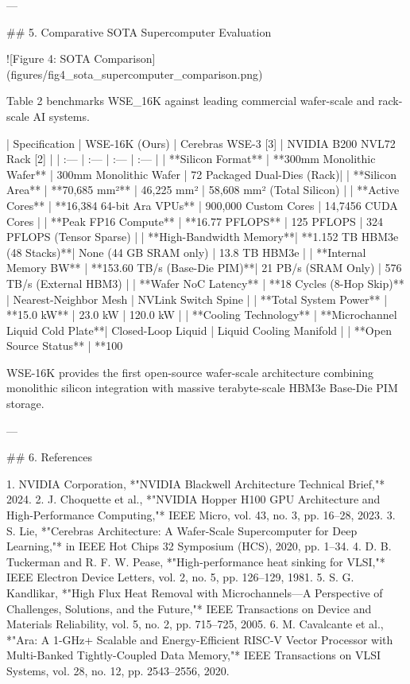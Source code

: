 \documentclass[journal,10pt,twocolumn]{IEEEtran}
\begin{document}
---

## 5. Comparative SOTA Supercomputer Evaluation

![Figure 4: SOTA Comparison](figures/fig4_sota_supercomputer_comparison.png)

Table 2 benchmarks WSE_16K against leading commercial wafer-scale and rack-scale AI systems.

| Specification | WSE-16K (Ours) | Cerebras WSE-3 [3] | NVIDIA B200 NVL72 Rack [2] |
| :--- | :--- | :--- | :--- |
| **Silicon Format** | **300mm Monolithic Wafer** | 300mm Monolithic Wafer | 72 Packaged Dual-Dies (Rack)|
| **Silicon Area** | **70,685 mm²** | 46,225 mm² | 58,608 mm² (Total Silicon) |
| **Active Cores** | **16,384 64-bit Ara VPUs** | 900,000 Custom Cores | 14,7456 CUDA Cores |
| **Peak FP16 Compute** | **16.77 PFLOPS** | 125 PFLOPS | 324 PFLOPS (Tensor Sparse) |
| **High-Bandwidth Memory**| **1.152 TB HBM3e (48 Stacks)**| None (44 GB SRAM only) | 13.8 TB HBM3e |
| **Internal Memory BW** | **153.60 TB/s (Base-Die PIM)**| 21 PB/s (SRAM Only) | 576 TB/s (External HBM3) |
| **Wafer NoC Latency** | **18 Cycles (8-Hop Skip)** | Nearest-Neighbor Mesh | NVLink Switch Spine |
| **Total System Power** | **15.0 kW** | 23.0 kW | 120.0 kW |
| **Cooling Technology** | **Microchannel Liquid Cold Plate**| Closed-Loop Liquid | Liquid Cooling Manifold |
| **Open Source Status** | **100%

WSE-16K provides the first open-source wafer-scale architecture combining monolithic silicon integration with massive terabyte-scale HBM3e Base-Die PIM storage.

---

## 6. References

1. NVIDIA Corporation, *"NVIDIA Blackwell Architecture Technical Brief,"* 2024.
2. J. Choquette et al., *"NVIDIA Hopper H100 GPU Architecture and High-Performance Computing,"* IEEE Micro, vol. 43, no. 3, pp. 16–28, 2023.
3. S. Lie, *"Cerebras Architecture: A Wafer-Scale Supercomputer for Deep Learning,"* in IEEE Hot Chips 32 Symposium (HCS), 2020, pp. 1–34.
4. D. B. Tuckerman and R. F. W. Pease, *"High-performance heat sinking for VLSI,"* IEEE Electron Device Letters, vol. 2, no. 5, pp. 126–129, 1981.
5. S. G. Kandlikar, *"High Flux Heat Removal with Microchannels—A Perspective of Challenges, Solutions, and the Future,"* IEEE Transactions on Device and Materials Reliability, vol. 5, no. 2, pp. 715–725, 2005.
6. M. Cavalcante et al., *"Ara: A 1-GHz+ Scalable and Energy-Efficient RISC-V Vector Processor with Multi-Banked Tightly-Coupled Data Memory,"* IEEE Transactions on VLSI Systems, vol. 28, no. 12, pp. 2543–2556, 2020.
\end{document}
